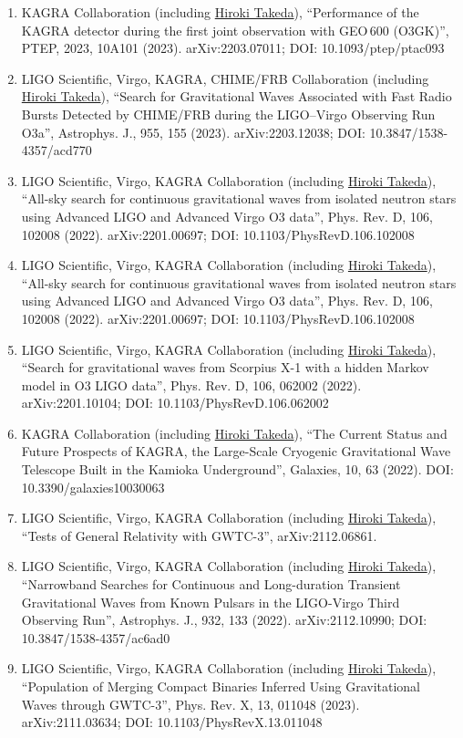 \documentclass[uplatex, 11pt]{jsarticle}
\begin{document}
\begin{enumerate}
\item KAGRA Collaboration (including \uline{Hiroki Takeda}), “Performance of the KAGRA detector during the first joint observation with GEO\,600 (O3GK)”, PTEP, 2023, 10A101 (2023). arXiv:2203.07011; DOI: 10.1093/ptep/ptac093
\item LIGO Scientific, Virgo, KAGRA, CHIME/FRB Collaboration (including \uline{Hiroki Takeda}), “Search for Gravitational Waves Associated with Fast Radio Bursts Detected by CHIME/FRB during the LIGO–Virgo Observing Run O3a”, Astrophys. J., 955, 155 (2023). arXiv:2203.12038; DOI: 10.3847/1538-4357/acd770
\item LIGO Scientific, Virgo, KAGRA Collaboration (including \uline{Hiroki Takeda}), “All-sky search for continuous gravitational waves from isolated neutron stars using Advanced LIGO and Advanced Virgo O3 data”, Phys. Rev. D, 106, 102008 (2022). arXiv:2201.00697; DOI: 10.1103/PhysRevD.106.102008
\item LIGO Scientific, Virgo, KAGRA Collaboration (including \uline{Hiroki Takeda}), “All-sky search for continuous gravitational waves from isolated neutron stars using Advanced LIGO and Advanced Virgo O3 data”, Phys. Rev. D, 106, 102008 (2022). arXiv:2201.00697; DOI: 10.1103/PhysRevD.106.102008
\item LIGO Scientific, Virgo, KAGRA Collaboration (including \uline{Hiroki Takeda}), “Search for gravitational waves from Scorpius X-1 with a hidden Markov model in O3 LIGO data”, Phys. Rev. D, 106, 062002 (2022). arXiv:2201.10104; DOI: 10.1103/PhysRevD.106.062002
\item KAGRA Collaboration (including \uline{Hiroki Takeda}), “The Current Status and Future Prospects of KAGRA, the Large-Scale Cryogenic Gravitational Wave Telescope Built in the Kamioka Underground”, Galaxies, 10, 63 (2022). DOI: 10.3390/galaxies10030063
\item LIGO Scientific, Virgo, KAGRA Collaboration (including \uline{Hiroki Takeda}), “Tests of General Relativity with GWTC-3”, arXiv:2112.06861.
\item LIGO Scientific, Virgo, KAGRA Collaboration (including \uline{Hiroki Takeda}), “Narrowband Searches for Continuous and Long-duration Transient Gravitational Waves from Known Pulsars in the LIGO-Virgo Third Observing Run”, Astrophys. J., 932, 133 (2022). arXiv:2112.10990; DOI: 10.3847/1538-4357/ac6ad0
\item LIGO Scientific, Virgo, KAGRA Collaboration (including \uline{Hiroki Takeda}), “Population of Merging Compact Binaries Inferred Using Gravitational Waves through GWTC-3”, Phys. Rev. X, 13, 011048 (2023). arXiv:2111.03634; DOI: 10.1103/PhysRevX.13.011048

\end{enumerate}
\end{document}
